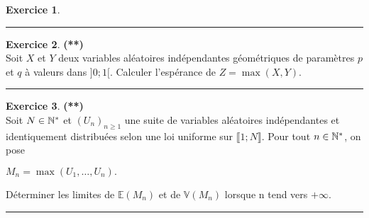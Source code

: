 \documentclass[a4paper,11pt]{article}
\theoremstyle{definition}
\newtheorem{exo}{Exercice} %
\begin{document}
\begin{minipage}{1\linewidth}
\begin{minipage}[t]{0.48\linewidth}
\begin{exo}
\centering\rule{1\linewidth}{0.6pt}\end{exo}


\begin{exo}\textbf{(**)}\quad\\[0.2cm]%
Soit $X$ et $Y$ deux variables aléatoires indépendantes géométriques de paramètres $p$ et $q$ à valeurs dans $]0;1[$. Calculer l'espérance de $Z= \max(X,Y)$. 

\centering\rule{1\linewidth}{0.6pt}\end{exo}

\begin{exo}\textbf{(**)}\quad\\[0.2cm]%
	Soit $N\in\mathbb{N}^*$ et $(U_n)_{n\geq1}$ une suite de variables aléatoires indépendantes et identiquement distribuées selon une loi uniforme sur $\llbracket1;N\rrbracket$. Pour tout $n\in\mathbb{N}^*$, on pose 
	\begin{center}
		$M_n = \max(U_1, \dots , U_n).$
	\end{center}
	Déterminer les limites de $\mathbb{E}(M_n)$ et de $\mathbb{V}(M_n)$ lorsque n tend vers $+\infty$.
	 
	\centering\rule{1\linewidth}{0.6pt}\end{exo}

\end{minipage}\end{minipage} \newpage
\end{document}
